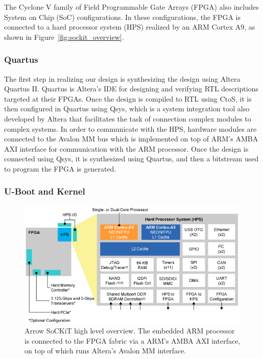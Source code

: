 \documentclass{sig-alternate-10pt}
\begin{document}
The Cyclone V family of Field Programmable Gate Arrays (FPGA) also includes
System on Chip (SoC) configurations. In these configurations, the FPGA is
connected to a hard processor system (HPS) realized by an ARM Cortex A9, as
shown in Figure~\ref{fig:sockit_overview}.

\subsubsection{Quartus}
The first step in realizing our design is synthesizing the design using Altera Quartus II. Quartus is Altera's IDE for designing and verifying RTL descriptions targeted at their FPGAs. Once the design is compiled to RTL using CtoS, it is then configured in Quartus using Qsys, which is a system integration tool also developed by Altera that facilitates the task of connection complex modules to complex systems. In order to communicate with the HPS, hardware modules are connected to the Avalon MM bus which is implemented on top of ARM's AMBA AXI interface for communication with the ARM processor. Once the design is connected using Qsys, it is synthesized using Quartus, and then a bitstream used to program the FPGA is generated.

\subsubsection{U-Boot and Kernel}
\begin{figure}
	\begin{center}
		\includegraphics[width=0.9\linewidth]{fig/soc_cyclonev.png}
		\caption{
			Arrow SoCKiT high level overview. The embedded ARM processor is connected to the FPGA fabric via a ARM's AMBA AXI interface, on top of which runs Altera's Avalon MM interface.
		}
		\label{fig:cyclone_diag}
	\end{center}
\end{figure}
\end{document}
